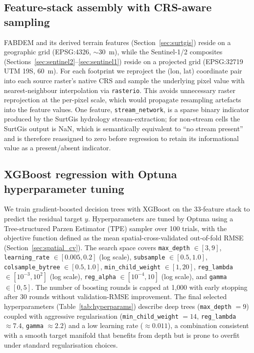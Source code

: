 \documentclass[preprint,authoryear,number]{elsarticle}
\begin{document}
\subsection{Feature-stack assembly with CRS-aware sampling}
\label{sec:feature_assembly}

FABDEM and its derived terrain features (Section~\ref{sec:surtgis}) reside on a geographic grid (EPSG:4326, $\sim$\SI{30}{\meter}), while the Sentinel-1/2 composites (Sections~\ref{sec:sentinel2}--\ref{sec:sentinel1}) reside on a projected grid (EPSG:32719 UTM 19S, \SI{60}{\meter}). For each footprint we reproject the (lon, lat) coordinate pair into each source raster's native CRS and sample the underlying pixel value with nearest-neighbour interpolation via \texttt{rasterio}. This avoids unnecessary raster reprojection at the per-pixel scale, which would propagate resampling artefacts into the feature values. One feature, \texttt{stream\_network}, is a sparse binary indicator produced by the SurtGis hydrology stream-extraction; for non-stream cells the SurtGis output is NaN, which is semantically equivalent to ``no stream present'' and is therefore reassigned to zero before regression to retain its informational value as a present/absent indicator.

\subsection{XGBoost regression with Optuna hyperparameter tuning}
\label{sec:xgboost}

We train gradient-boosted decision trees with XGBoost \citep{Chen2016XGBoost} on the 33-feature stack to predict the residual target $y$. Hyperparameters are tuned by Optuna \citep{Akiba2019Optuna} using a Tree-structured Parzen Estimator (TPE) sampler over 100 trials, with the objective function defined as the mean spatial-cross-validated out-of-fold RMSE (Section~\ref{sec:spatial_cv}). The search space covers \texttt{max\_depth} $\in [3, 9]$, \texttt{learning\_rate} $\in [0.005, 0.2]$ (log scale), \texttt{subsample} $\in [0.5, 1.0]$, \texttt{colsample\_bytree} $\in [0.5, 1.0]$, \texttt{min\_child\_weight} $\in [1, 20]$, \texttt{reg\_lambda} $\in [10^{-3}, 10^{2}]$ (log scale), \texttt{reg\_alpha} $\in [10^{-4}, 10]$ (log scale), and \texttt{gamma} $\in [0, 5]$. The number of boosting rounds is capped at 1{,}000 with early stopping after 30 rounds without validation-RMSE improvement. The final selected hyperparameters (Table~\ref{tab:hyperparams}) describe deep trees (\texttt{max\_depth} $= 9$) coupled with aggressive regularisation (\texttt{min\_child\_weight} $= 14$, \texttt{reg\_lambda} $\approx 7.4$, \texttt{gamma} $\approx 2.2$) and a low learning rate ($\approx 0.011$), a combination consistent with a smooth target manifold that benefits from depth but is prone to overfit under standard regularisation choices.
\end{document}
